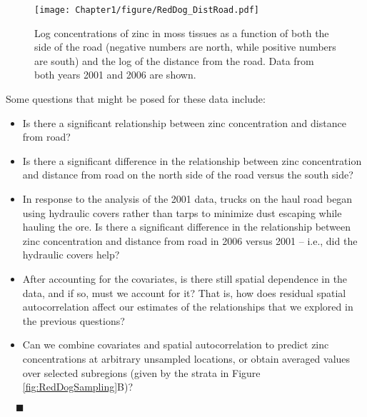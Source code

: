 \begin{figure}
\begin{center}
\texttt{[image: Chapter1/figure/RedDog\_DistRoad.pdf]}
\caption{Log concentrations of zinc in moss tissues as a function of both the side of the road (negative numbers are north, while positive numbers are south) and the log of the distance from the road.  Data from both years 2001 and 2006 are shown.\label{fig:RedDogDistRoad}}
\end{center}
\end{figure}

Some questions that might be posed for these data include:
\begin{itemize}
\item Is there a significant relationship between zinc concentration and distance from road?
\item Is there a significant difference in the relationship between zinc concentration and distance from road on the north side of the road versus the south side?
\item In response to the analysis of the 2001 data, trucks on the haul road began using hydraulic covers rather than tarps to minimize dust escaping while hauling the ore.  Is there a significant difference in the relationship between zinc concentration and distance from road in 2006 versus 2001 -- i.e., did the hydraulic covers help?
\item After accounting for the covariates, is there still spatial dependence in the data, and if so, must we account for it?  That is, how does residual spatial autocorrelation affect our estimates of the relationships that we explored in the previous questions?
\item Can we combine covariates and spatial autocorrelation to predict zinc concentrations  at arbitrary unsampled locations, or obtain averaged values over selected subregions (given by the strata in Figure \ref{fig:RedDogSampling}B)?
\end{itemize}

$\quad\blacksquare$
\vspace{.5in}


